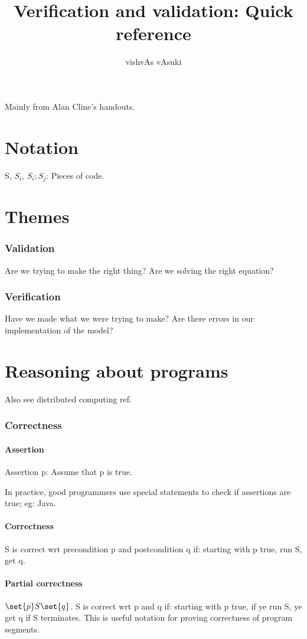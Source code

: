 \documentclass{article}
\title{Verification and validation: Quick reference}
\author{vishvAs vAsuki}
\begin{document}
\maketitle

Mainly from Alan Cline's handouts.

\part{Notation}
S, $S_{i}$, $S_{i};S_{j}$: Pieces of code.

\part{Themes}
\section{Validation}
Are we trying to make the right thing? Are we solving the right equation?

\section{Verification}
Have we made what we were trying to make? Are there errors in our implementation of the model?

\part{Reasoning about programs}
Also see distributed computing ref.

\section{Correctness}
\subsection{Assertion}
Assertion p: Assume that p is true.

In practice, good programmers use special statements to check if assertions are true; eg: Java.

\subsection{Correctness}
S is correct wrt precondition p and postcondition q if: starting with p true, run S, get q.

\subsection{Partial correctness}
$\set{p}S\set{q}$. S is correct wrt p and q if: starting with p true, if ye run S, ye get q if S terminates. This is useful notation for proving correctness of program segments.
\end{document}
